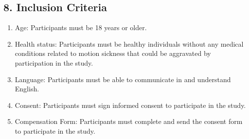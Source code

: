 \documentclass[A4,11pt]{article}
\begin{document}
\subsection*{8. Inclusion Criteria}
\begin{enumerate}
\item 
Age: Participants must be 18 years or older.

\item 
Health status: Participants must be healthy individuals without any medical conditions related to motion sickness that could be aggravated by participation in the study. 

\item 
Language: Participants must be able to communicate in and understand English.

\item 
Consent: Participants must sign informed consent to participate in the study.

\item 
Compensation Form: Participants must complete and send the consent form to participate in the study.
\end{enumerate}
\end{document}
